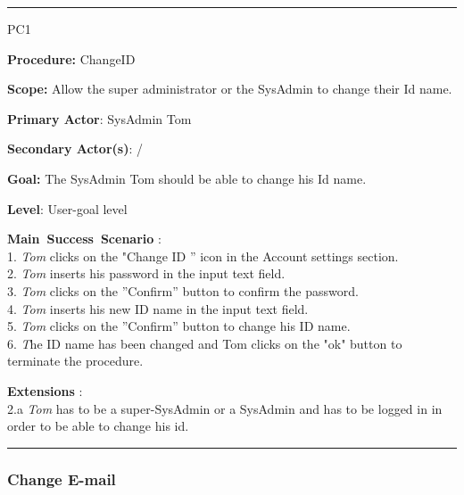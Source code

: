 \hrule
\vspace{0.5cm}
\begin{lyxlist}{PC1}
\small{
\item [\textbf{Procedure:}] ChangeID 
\item [\textbf{Scope:}] Allow the super administrator or the SysAdmin to change
their Id name.
\item [\textbf{Primary Actor}:] SysAdmin Tom
\item [\textbf{Secondary Actor(s)}:] /
\item [\textbf{Goal:}] The SysAdmin Tom should be able to change his Id name.
\item [\textbf{Level}:] User-goal level
\item [\textbf{Main~Success~Scenario}]:\\
1. \emph{Tom} clicks on the "Change ID '' icon in the Account settings
section.\\
2. \emph{Tom} inserts his password in the input text field.\\
3. \emph{Tom} clicks on the ''Confirm'' button to confirm the password.\\
4. \emph{Tom} inserts his new ID name in the input text field.\\
5. \emph{Tom} clicks on the ''Confirm'' button to change his ID name.\\
6. \emph The ID name has been changed and {Tom} clicks on the "ok" button
to terminate the procedure.\\

\item [\textbf{Extensions}]:\\
2.a \emph{Tom} has to be a super-SysAdmin or a SysAdmin and has to be logged
in in order to be able to change his id.\\
}
\end{lyxlist}
\hrule


\subsubsection{Change E-mail}

